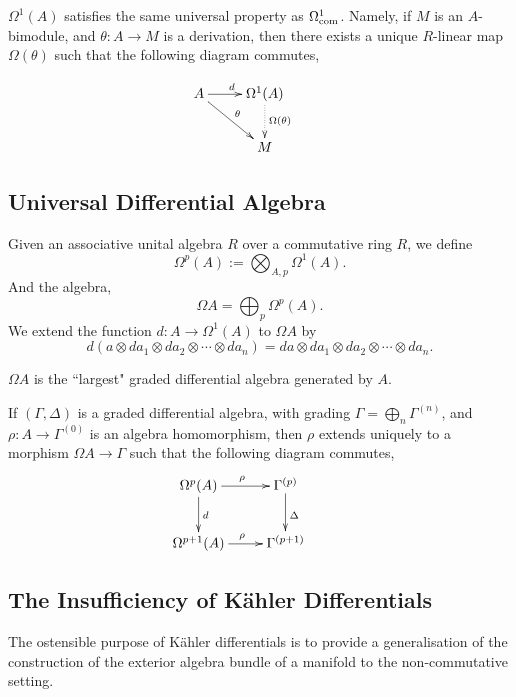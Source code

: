 $\Omega^1(A)$ satisfies the 
same universal property as $\Omega^1_{\operatorname{com}}$. Namely, if $M$ is an $A$-bimodule,
and $\theta:A\rightarrow M$ is a derivation, then there exists a unique $R$-linear
map $\Omega(\theta)$ such that the following diagram commutes,

    \begin{displaymath}
    \xymatrix{
        A \ar[r]^d \ar[rd]^\theta & 
        \Omega^1(A) \ar@{.>}[d]^{\Omega(\theta)} &\\
         &
        M
  } 
  \end{displaymath}
  
\subsection{Universal Differential Algebra}
Given an associative unital algebra $R$ over a commutative ring $R$,
we define
\begin{equation*}
    \Omega^p(A) := \bigotimes_{A,p} \Omega^1(A).
\end{equation*} 
And the algebra,
\begin{equation*}
    \Omega A = \bigoplus_{p} \Omega^p(A).
\end{equation*}
We extend the function $d:A\rightarrow \Omega^1(A)$ to $\Omega A$
by
\begin{equation*}
    d(a\otimes da_1\otimes da_2\otimes \cdots \otimes da_n) = da\otimes da_1\otimes da_2\otimes \cdots\otimes da_n.
\end{equation*}
 
\begin{theorem}
    $\Omega A$ is the ``largest" graded differential algebra generated by $A$. 
    
    If $(\Gamma,\Delta)$ is a graded differential algebra, with grading $\Gamma = \bigoplus_n \Gamma^{(n)}$,
    and $\rho:A\rightarrow \Gamma^{(0)}$ is an algebra homomorphism, then $\rho$
    extends uniquely to a morphism $\Omega A\rightarrow \Gamma$ such that the following
    diagram commutes,
    \begin{displaymath}
    \xymatrix{
        \Omega^p(A) \ar[r]^\rho \ar[d]^{d} & 
        \Gamma^{(p)} \ar[d]^\Delta&\\
        \Omega^{p+1}(A) \ar[r]^\rho & 
        \Gamma^{(p+1)}&
    }
    \end{displaymath}
\end{theorem}

\subsection{The Insufficiency of K\"ahler Differentials}
The ostensible purpose of K\"ahler differentials is to provide
a generalisation of the construction of the exterior algebra
bundle of a manifold to the non-commutative setting.

